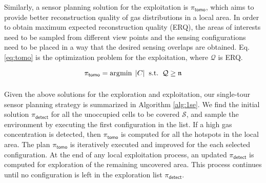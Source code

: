 Similarly, a sensor planning solution for the exploitation is $\pi_{\mathsf{tomo}}$, which aims to provide better reconstruction quality of gas distributions in a local area. In order to obtain maximum expected reconstruction quality (ERQ), the areas of interests need to be sampled from different view points and the sensing configurations need to be placed in a way that the desired sensing overlaps are obtained. Eq. \ref{eq:tomo} is the optimization problem for the exploitation, where $\mathcal{Q}$ is ERQ.


\begin{equation}
\pi_\mathsf{tomo} = \displaystyle\operatorname*{\arg\!\min}_{} \; |C| \;\; \mbox{s.t.} \;\; \mathcal{Q} \ge \mathfrak{n}
\label{eq:tomo}
\end{equation}






Given the above solutions for the exploration and exploitation, our single-tour sensor planning strategy is summarized in Algorithm \ref{alg:1se}. We find the initial solution $\pi_{\mathsf{detect}}$ for all the unoccupied cells to be covered $\mathcal{S}$, and sample the environment by executing the first configuration in the list. If a high gas concentration is detected, then $\pi_{\mathsf{tomo}}$ is computed for all the hotspots in the local area. The plan $\pi_{\mathsf{tomo}}$ is iteratively executed and improved for the each selected configuration. At the end of any local exploitation process, an updated $\pi_{\mathsf{detect}}$ is computed for exploration of the remaining uncovered area. This process continues until no configuration is left in the exploration list $\pi_{\mathsf{detect}}$.

 
